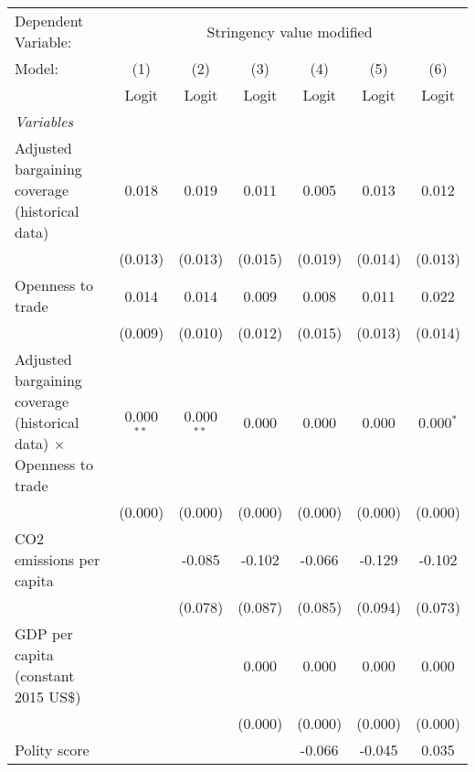 
\begingroup
\centering
\begin{tabular}{lcccccc}
   \toprule
   Dependent Variable: & \multicolumn{6}{c}{Stringency value modified}\\
   Model:                                                                     & (1)          & (2)          & (3)     & (4)     & (5)     & (6)\\  
                                                                              &  Logit       & Logit        & Logit   & Logit   & Logit   & Logit\\  
   \midrule
   \emph{Variables}\\
   Adjusted bargaining coverage (historical data)                             & 0.018        & 0.019        & 0.011   & 0.005   & 0.013   & 0.012\\   
                                                                              & (0.013)      & (0.013)      & (0.015) & (0.019) & (0.014) & (0.013)\\   
   Openness to trade                                                          & 0.014        & 0.014        & 0.009   & 0.008   & 0.011   & 0.022\\   
                                                                              & (0.009)      & (0.010)      & (0.012) & (0.015) & (0.013) & (0.014)\\   
   Adjusted bargaining coverage (historical data) $\times$ Openness to trade  & 0.000$^{**}$ & 0.000$^{**}$ & 0.000   & 0.000   & 0.000   & 0.000$^{*}$\\   
                                                                              & (0.000)      & (0.000)      & (0.000) & (0.000) & (0.000) & (0.000)\\   
   CO2 emissions per capita                                                   &              & -0.085       & -0.102  & -0.066  & -0.129  & -0.102\\   
                                                                              &              & (0.078)      & (0.087) & (0.085) & (0.094) & (0.073)\\   
   GDP per capita (constant 2015 US\$)                                        &              &              & 0.000   & 0.000   & 0.000   & 0.000\\   
                                                                              &              &              & (0.000) & (0.000) & (0.000) & (0.000)\\   
   Polity score                                                               &              &              &         & -0.066  & -0.045  & 0.035\\   

\end{tabular}
